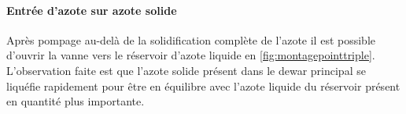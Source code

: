 \paragraph*{Entrée d'azote sur azote solide}
Après pompage au-delà de la solidification complète de l'azote il est possible d'ouvrir la vanne vers le réservoir d'azote liquide en \autoref{fig:montagepointtriple}. L'observation faite est que l'azote solide présent dans le dewar principal se liquéfie rapidement pour être en équilibre avec l'azote liquide du réservoir présent en quantité plus importante.
